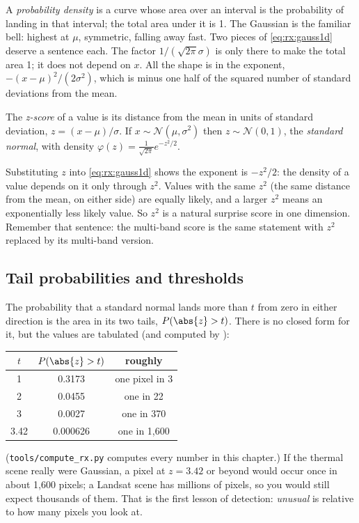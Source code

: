 A \emph{probability density} is a curve whose area over an interval is
the probability of landing in that interval; the total area under it is 1. The Gaussian is the
familiar bell: highest at $\mu$, symmetric, falling away fast. Two pieces of \cref{eq:rx:gauss1d}
deserve a sentence each. The factor $1/(\sqrt{2\pi}\sigma)$ is only there to make the total area 1;
it does not depend on $x$. All the shape is in the exponent, $-(x - \mu)^2/(2\sigma^2)$, which is
minus one half of the squared number of standard deviations from the mean.

\begin{definition}[z-score]
The \emph{z-score} of a value is its distance from the mean in units of standard deviation,
$z = (x - \mu)/\sigma$. If $x \sim \mathcal{N}(\mu, \sigma^2)$ then $z \sim \mathcal{N}(0, 1)$, the
\emph{standard normal}, with density
$\varphi(z) = \frac{1}{\sqrt{2\pi}}e^{-z^2/2}$.
\end{definition}

Substituting $z$ into \cref{eq:rx:gauss1d} shows the exponent is $-z^2/2$: the density of a value
depends on it only through $z^2$. Values with the same $z^2$ (the same distance from the mean, on
either side) are equally likely, and a larger $z^2$ means an exponentially less likely value. So
$z^2$ is a natural surprise score in one dimension. Remember that sentence: the multi-band score is
the same statement with $z^2$ replaced by its multi-band version.

\subsection{Tail probabilities and thresholds}

The probability that a standard normal lands more than $t$ from zero in either direction is the
area in its two tails, $P(\abs{z} > t)$. There is no closed form for it, but the values are
tabulated (and computed by ):
\begin{center}
\begin{tabular}{ccc}
\toprule
$t$ & $P(\abs{z} > t)$ & roughly\\
\midrule
1    & 0.3173   & one pixel in 3\\
2    & 0.0455   & one in 22\\
3    & 0.0027   & one in 370\\
3.42 & 0.000626 & one in 1{,}600\\
\bottomrule
\end{tabular}
\end{center}
(\texttt{tools/compute\_rx.py} computes every number in this chapter.) If the thermal scene really
were Gaussian, a pixel at $z = 3.42$ or beyond would occur once in about 1,600 pixels; a Landsat
scene has millions of pixels, so you would still expect thousands of them. That is the first
lesson of detection: \emph{unusual} is relative to how many pixels you look at.

